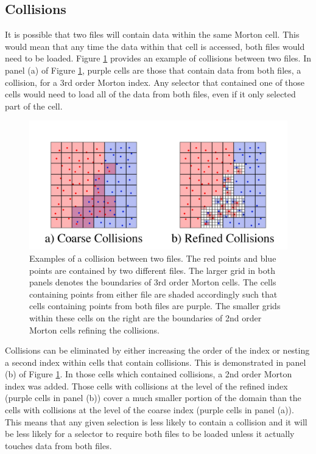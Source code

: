 \documentclass[apjl]{emulateapj}
\begin{document}
\subsection{Collisions}
It is possible that two files will contain data within the same Morton cell. This would mean that any time the data within that cell is accessed, both files would need to be loaded. Figure \ref{fig:collision} provides an example of collisions between two files. In panel (a) of Figure \ref{fig:collision}, purple cells are those that contain data from both files, a collision, for a 3rd order Morton index. Any selector that contained one of those cells would need to load all of the data from both files, even if it only selected part of the cell.
%
\begin{figure}[htbp]
\begin{center}
\includegraphics[width=\columnwidth,keepaspectratio]{../images/collisions.png}
\caption{Examples of a collision between two files. The red points and blue points are contained by two different files. The larger grid in both panels denotes the boundaries of 3rd order Morton cells.  The cells containing points from either file are shaded accordingly such that cells containing points from both files are purple. The smaller grids within these cells on the right are the boundaries of 2nd order Morton cells refining the collisions.}
\label{fig:collision}
\end{center}
\end{figure}
%

Collisions can be eliminated by either increasing the order of the index or nesting a second index within cells that contain collisions. This is demonstrated in panel (b) of Figure \ref{fig:collision}. In those cells which contained collisions, a 2nd order Morton index was added. Those cells with collisions at the level of the refined index (purple cells in panel (b)) cover a much smaller portion of the domain than the cells with collisions at the level of the coarse index (purple cells in panel (a)). This means that any given selection is less likely to contain a collision and it will be less likely for a selector to require both files to be loaded unless it actually touches data from both files.
\end{document}
